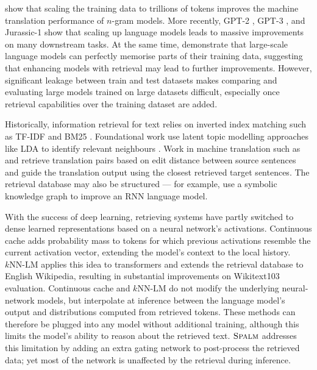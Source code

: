 \documentclass[11pt, a4paper, logo]{deepmind}
\newcommand{\knnlm}{k\textrm{NN-LM}}
\newcommand{\spalm}{\textsc{Spalm}}
\begin{document}
\citet{brants2007_large_language_models_in_mt} show that scaling the training data to trillions of tokens improves the machine translation performance of $n$-gram models. 
More recently, GPT-2 \citep{radford2019language}, GPT-3 \citep{brown2020language}, and Jurassic-1 \citep{jurassic} show that scaling up language models leads to massive improvements on many downstream tasks. 
At the same time, \citet{carlini2021extracting} demonstrate that large-scale language models can perfectly memorise parts of their training data, suggesting that enhancing models with retrieval may lead to further improvements.
However, significant leakage between train and test datasets \citep{lee2021deduplicating, lewis2020question} makes comparing and evaluating large models trained on large datasets difficult, especially once retrieval capabilities over the training dataset are added. 

Historically, information retrieval for text relies on inverted index matching such as TF-IDF and BM25 \citep{robertson2009probabilistic}. Foundational work use latent topic modelling approaches like LDA \citep{blei_latent_2003} to identify relevant neighbours \citep{wei_lda-based_2006}.
Work in machine translation such as \citet{zhang2018guiding} and \citet{gu2018search} retrieve translation pairs based on edit distance between source sentences and guide the translation output using the closest retrieved target sentences.
The retrieval database may also be structured --- for example, \citet{ahn2016neural} use a symbolic knowledge graph to improve an RNN language model.

With the success of deep learning, retrieving systems have partly switched to dense learned representations based on a neural network's activations.
Continuous cache \citep{grave2016improving} adds probability mass to tokens for which previous activations resemble the current activation vector, extending the model's context to the local history.
$\knnlm$ \citep{khandelwal2020generalization} applies this idea to transformers and extends the retrieval database to English Wikipedia, resulting in substantial improvements on Wikitext103 evaluation.
Continuous cache and $\knnlm$ do not modify the underlying neural-network models, but interpolate at inference between the language model's output and distributions computed from retrieved tokens.
These methods can therefore be plugged into any model without additional training, although this limits the model's ability to reason about the retrieved text.
$\spalm$ \citep{yogatama2021adaptive} addresses this limitation by adding an extra gating network to post-process the retrieved data; yet most of the network is unaffected by the retrieval during inference.
\end{document}
